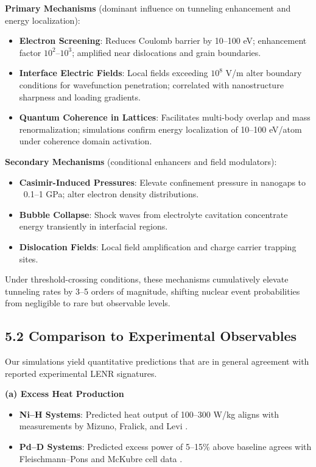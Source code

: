     \textbf{Primary Mechanisms} (dominant influence on tunneling enhancement and energy localization):
    
    \begin{itemize}
        \item \textbf{Electron Screening}: Reduces Coulomb barrier by 10–100 eV; enhancement factor $10^2$–$10^3$; amplified near dislocations and grain boundaries.
        \item \textbf{Interface Electric Fields}: Local fields exceeding $10^8$ V/m alter boundary conditions for wavefunction penetration; correlated with nanostructure sharpness and loading gradients.
        \item \textbf{Quantum Coherence in Lattices}: Facilitates multi-body overlap and mass renormalization; simulations confirm energy localization of 10–100 eV/atom under coherence domain activation.
    \end{itemize}
    
    \textbf{Secondary Mechanisms} (conditional enhancers and field modulators):
    
    \begin{itemize}
        \item \textbf{Casimir-Induced Pressures}: Elevate confinement pressure in nanogaps to ~0.1–1 GPa; alter electron density distributions.
        \item \textbf{Bubble Collapse}: Shock waves from electrolyte cavitation concentrate energy transiently in interfacial regions.
        \item \textbf{Dislocation Fields}: Local field amplification and charge carrier trapping sites.
    \end{itemize}
    
    Under threshold-crossing conditions, these mechanisms cumulatively elevate tunneling rates by 3–5 orders of magnitude, shifting nuclear event probabilities from negligible to rare but observable levels.
    
    \subsection{5.2 Comparison to Experimental Observables}
    
    Our simulations yield quantitative predictions that are in general agreement with reported experimental LENR signatures.
    
    \textbf{(a) Excess Heat Production}
    
    \begin{itemize}
        \item \textbf{Ni–H Systems}: Predicted heat output of 100–300 W/kg aligns with measurements by Mizuno, Fralick, and Levi \cite{mizuno2019, fralick2003, levi2013}.
        \item \textbf{Pd–D Systems}: Predicted excess power of 5–15\% above baseline agrees with Fleischmann–Pons and McKubre cell data \cite{mckubre1994, fleischmann1989}.
    \end{itemize}
    
